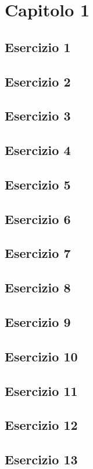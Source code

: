 \section{\textbf{Capitolo 1}}
\subsection{Esercizio 1}

\subsection{Esercizio 2}

\subsection{Esercizio 3}

\newpage
\subsection{Esercizio 4}

\subsection{Esercizio 5}

\subsection{Esercizio 6}

\subsection{Esercizio 7}

\subsection{Esercizio 8}

\subsection{Esercizio 9}

\subsection{Esercizio 10}

\subsection{Esercizio 11}

\subsection{Esercizio 12}

\subsection{Esercizio 13}
